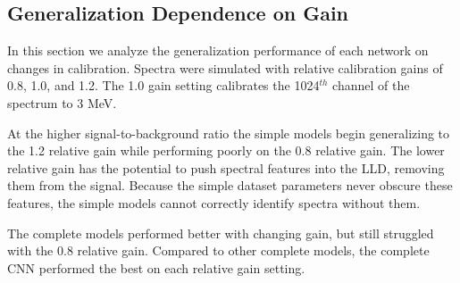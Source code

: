 \subsection{Generalization Dependence on Gain}

In this section we analyze the generalization performance of each network on changes in calibration. Spectra were simulated with relative calibration gains of 0.8, 1.0, and 1.2. The 1.0 gain setting calibrates the 1024$^{th}$ channel of the spectrum to 3 MeV.

At the higher signal-to-background ratio the simple models begin generalizing to the 1.2 relative gain while performing poorly on the 0.8 relative gain. The lower relative gain has the potential to push spectral features into the LLD, removing them from the signal. Because the simple dataset parameters never obscure these features, the simple models cannot correctly identify spectra without them.

The complete models performed better with changing gain, but still struggled with the 0.8 relative gain.  Compared to other complete models, the complete CNN performed the best on each relative gain setting.



